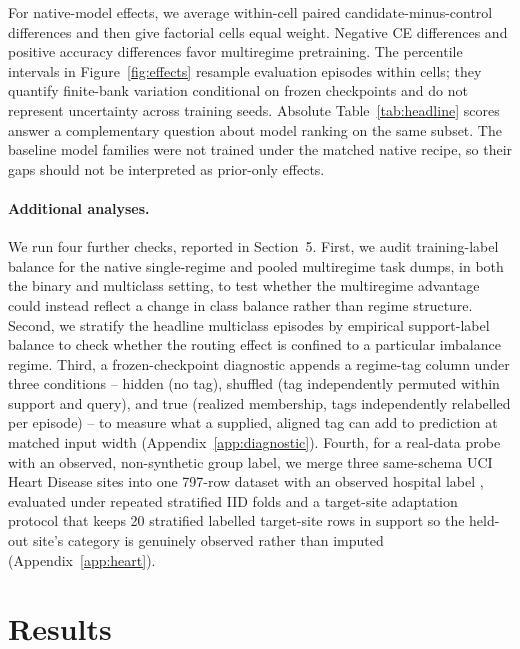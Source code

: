 \documentclass{article}
\begin{document}
For native-model effects, we average within-cell paired candidate-minus-control differences and then give factorial cells equal weight. Negative CE differences and positive accuracy differences favor multiregime pretraining. The percentile intervals in Figure~\ref{fig:effects} resample evaluation episodes within cells; they quantify finite-bank variation conditional on frozen checkpoints and do not represent uncertainty across training seeds. Absolute Table~\ref{tab:headline} scores answer a complementary question about model ranking on the same subset. The baseline model families were not trained under the matched native recipe, so their gaps should not be interpreted as prior-only effects.

\paragraph{Additional analyses.} We run four further checks, reported in Section~5. First, we audit training-label balance for the native single-regime and pooled multiregime task dumps, in both the binary and multiclass setting, to test whether the multiregime advantage could instead reflect a change in class balance rather than regime structure. Second, we stratify the headline multiclass episodes by empirical support-label balance to check whether the routing effect is confined to a particular imbalance regime. Third, a frozen-checkpoint diagnostic appends a regime-tag column under three conditions -- hidden (no tag), shuffled (tag independently permuted within support and query), and true (realized membership, tags independently relabelled per episode) -- to measure what a supplied, aligned tag can add to prediction at matched input width (Appendix~\ref{app:diagnostic}). Fourth, for a real-data probe with an observed, non-synthetic group label, we merge three same-schema UCI Heart Disease sites into one 797-row dataset with an observed hospital label \citep{janosi1989heart}, evaluated under repeated stratified IID folds and a target-site adaptation protocol that keeps 20 stratified labelled target-site rows in support so the held-out site's category is genuinely observed rather than imputed (Appendix~\ref{app:heart}).

\section{Results}
\end{document}
